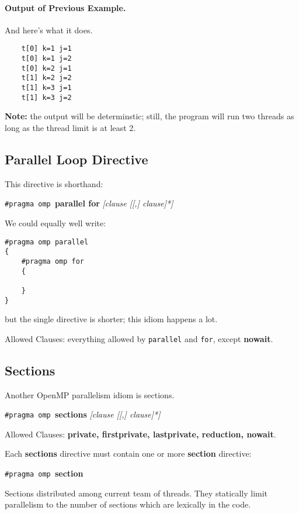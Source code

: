 \paragraph{Output of Previous Example.} And here's what it does.

{\small
  \begin{lstlisting}
    t[0] k=1 j=1
    t[0] k=1 j=2
    t[0] k=2 j=1
    t[1] k=2 j=2
    t[1] k=3 j=1
    t[1] k=3 j=2
  \end{lstlisting}
}

  {\bf Note:} the output will be determinstic; still, the program will run two threads as
  long as the thread limit is at least 2.

\subsection*{Parallel Loop Directive} This directive is shorthand:

  \begin{center}
    {\tt \#pragma omp }{\bf parallel for} {\it [clause [[,] clause]*]}
  \end{center}

We could equally well write:
{\small
  \begin{lstlisting}
#pragma omp parallel
{
    #pragma omp for
    {

    }
}
  \end{lstlisting}
}
but the single directive is shorter; this idiom happens a lot.

Allowed Clauses: everything allowed by {\tt parallel} and {\tt for}, except
  {\bf nowait}.

\subsection*{Sections}
Another OpenMP parallelism idiom is sections.
  \begin{center}
    {\tt \#pragma omp }{\bf sections} {\it [clause [[,] clause]*]}
  \end{center}

  Allowed Clauses: {\bf private, firstprivate, lastprivate, reduction, nowait}.

Each {\bf sections} directive must contain one or more {\bf section} directive:
  \begin{center}
    {\tt \#pragma omp }{\bf section}
  \end{center}
  
Sections distributed among current team of threads.
They statically limit parallelism to the number of
      sections which are lexically in the code.


